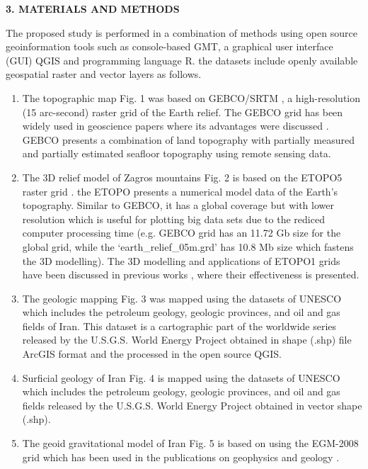 \documentclass[12pt,a4paper,oneside]{article}
\def \newsection{\vspace{12pt}\textbf}
\def \newpar{\vspace{6pt}}
\begin{document}
\newsection {3. MATERIALS AND METHODS}

\newpar The proposed study is performed in a combination of methods using open source geoinformation tools such as console-based GMT, a graphical user interface (GUI) QGIS and programming language R. the datasets include openly available geospatial raster and vector layers as follows. 

\begin{enumerate}  
	\item The topographic map Fig. 1 was based on GEBCO/SRTM \cite{GEBCO}, a high-resolution (15 arc-second) raster grid of the Earth relief. The GEBCO grid has been widely used in geoscience papers where its advantages were discussed \cite{Lemenkova2020c,Lemenkova2020d}. GEBCO presents a combination of land topography with partially measured and partially estimated seafloor topography using remote sensing data. 
	\item The 3D relief model of Zagros mountains Fig. 2 is based on the ETOPO5 raster grid \cite{AmanteEakins}. the ETOPO presents a numerical model data of the Earth’s topography. Similar to GEBCO, it has a global coverage but with lower resolution which is useful for plotting big data sets due to the rediced computer processing time (e.g. GEBCO grid has an 11.72 Gb size for the global grid, while the ‘earth\_relief\_05m.grd’ has 10.8 Mb size which fastens the 3D modelling). The 3D modelling and applications of ETOPO1 grids have been discussed in previous works \cite{Lemenkova2020e,Verard,Lemenkova2020f,Spooner,Lemenkova2020g}, where their effectiveness is presented. 
	\item The geologic mapping Fig. 3 was mapped using the datasets of UNESCO which includes the petroleum geology, geologic provinces, and oil and gas fields of Iran. This dataset is a cartographic part of the worldwide series released by the U.S.G.S. World Energy Project obtained in shape (.shp) file ArcGIS format and the processed in the open source QGIS.
	\item Surficial geology of Iran Fig. 4 is mapped using the datasets of UNESCO which includes the petroleum geology, geologic provinces, and oil and gas fields released by the U.S.G.S. World Energy Project obtained in vector shape (.shp).
	\item The geoid gravitational model of Iran Fig. 5 is based on using the EGM-2008 grid \cite{Pavlis} which has been used in the publications on geophysics and geology \cite{Lemenkova2020h}.

\end{enumerate}
\end{document}
